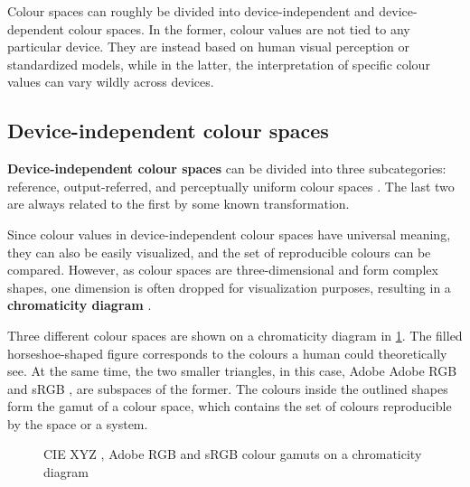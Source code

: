 Colour spaces can roughly be divided into device-independent and device-dependent colour spaces. In the former, colour values are not tied to any particular device. They are instead based on human visual perception or standardized models, while in the latter, the interpretation of specific colour values can vary wildly across devices.

\subsection{Device-independent colour spaces}

\textbf{Device-independent colour spaces} can be divided into three subcategories: reference, output-referred, and perceptually uniform colour spaces \cite[ch.~4.1-4.5]{rowlands2020physics}. The last two are always related to the first by some known transformation. 

Since colour values in device-independent colour spaces have universal meaning, they can also be easily visualized, and the set of reproducible colours can be compared. However, as colour spaces are three-dimensional and form complex shapes, one dimension is often dropped for visualization purposes, resulting in a \textbf{chromaticity diagram} \cite[42-44]{measuringcolour}.

Three different colour spaces are shown on a chromaticity diagram in \ref{fig:gamut}. The filled horseshoe-shaped figure corresponds to the colours a human could theoretically see. At the same time, the two smaller triangles, in this case, Adobe Adobe RGB \cite{adobeRGB} and sRGB \cite{sRGB}, are subspaces of the former. The colours inside the outlined shapes form the gamut of a colour space, which contains the set of colours reproducible by the space or a system.

\begin{figure}
    \centering
    \caption{CIE XYZ \cite{cie1931}, Adobe RGB \cite{adobeRGB} and sRGB \cite{sRGB} colour gamuts on a chromaticity diagram}
    \label{fig:gamut}
\end{figure}

